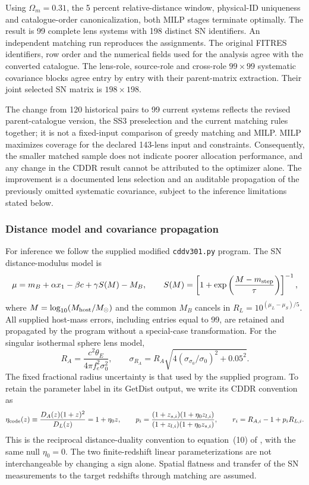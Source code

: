 Using $\Omega_m=0.31$, the 5 percent relative-distance window, physical-ID uniqueness and catalogue-order canonicalization, both MILP stages terminate optimally. The result is 99 complete lens systems with 198 distinct SN identifiers. An independent matching run reproduces the assignments. The original FITRES identifiers, row order and the numerical fields used for the analysis agree with the converted catalogue. The lens-role, source-role and cross-role $99\times99$ systematic covariance blocks agree entry by entry with their parent-matrix extraction. Their joint selected SN matrix is $198\times198$.

The change from 120 historical pairs to 99 current systems reflects the revised parent-catalogue version, the SS3 preselection and the current matching rules together; it is not a fixed-input comparison of greedy matching and MILP. MILP maximizes coverage for the declared 143-lens input and constraints. Consequently, the smaller matched sample does not indicate poorer allocation performance, and any change in the CDDR result cannot be attributed to the optimizer alone. The improvement is a documented lens selection and an auditable propagation of the previously omitted systematic covariance, subject to the inference limitations stated below.

\subsubsection{Distance model and covariance propagation}

For inference we follow the supplied modified \texttt{cddv301.py} program. The SN distance-modulus model is
\begin{equation}
 \mu=m_B+\alpha x_1-\beta c+\gamma S(M)-M_B,\qquad
 S(M)=\left[1+\exp\left(\frac{M-m_{\rm step}}{\tau}\right)\right]^{-1},
 \label{eq:cddr_host}
\end{equation}
where $M=\log_{10}(M_{\rm host}/M_\odot)$ and the common $M_B$ cancels in $R_L=10^{(\mu_L-\mu_S)/5}$. All supplied host-mass errors, including entries equal to 99, are retained and propagated by the program without a special-case transformation. For the singular isothermal sphere lens model,
\begin{equation}
 R_A=\frac{c^2\theta_E}{4\pi f_e^2\sigma_0^2},\qquad
 \sigma_{R_A}=R_A\sqrt{4(\sigma_{\sigma_0}/\sigma_0)^2+0.05^2}.
\end{equation}
The fixed fractional radius uncertainty is that used by the supplied program. To retain the parameter label in its GetDist output, we write its CDDR convention as
\begin{equation}
 \eta_{\rm code}(z)\equiv\frac{D_A(z)(1+z)^2}{D_L(z)}=1+\eta_0z,\qquad
 p_i=\frac{(1+z_{s,i})(1+\eta_0z_{l,i})}{(1+z_{l,i})(1+\eta_0z_{s,i})},\qquad
 r_i=R_{A,i}-1+p_iR_{L,i}.
 \label{eq:cddr_eta}
\end{equation}
This is the reciprocal distance-duality convention to equation~(10) of \citet{Zhou2021}, with the same null $\eta_0=0$. The two finite-redshift linear parameterizations are not interchangeable by changing a sign alone. Spatial flatness and transfer of the SN measurements to the target redshifts through matching are assumed.


